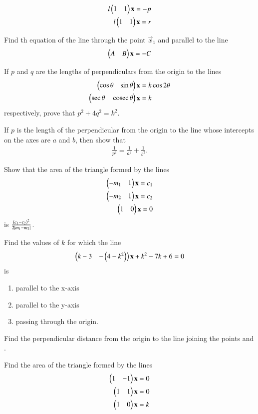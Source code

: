 %
\begin{align}
l\begin{pmatrix}1 & 1\end{pmatrix}\mathbf{x} = -p
\\
l\begin{pmatrix}1 & 1\end{pmatrix}\mathbf{x} = r
\end{align}
%
\item Find th equation of the line through the point $\vec{x}_1$ and parallel to the line
%
\begin{align}
\begin{pmatrix}A & B\end{pmatrix}\mathbf{x} = -C
\end{align}
%
\item If $p$ and $q$ are the lengths of perpendiculars from the origin to the lines 
%
\begin{align}
\begin{pmatrix}\cos\theta & \sin\theta\end{pmatrix}\mathbf{x} &= k\cos2\theta
\\
\begin{pmatrix}\sec\theta & \,\text{cosec}\,\theta\end{pmatrix}\mathbf{x} &= k
\end{align}
%
respectively, prove that $p^2+4q^2=k^2$.
\item If $p$ is the length of the perpendicular from the origin to the line whose intercepts on the axes are $a$ and $b$, then show that 
%
\begin{align}
\frac{1}{p^2} = \frac{1}{a^2}+\frac{1}{b^2}.
\end{align}
%
\item Show that the area of the triangle formed by the lines
%
\begin{align}
\begin{pmatrix}-m_1 & 1\end{pmatrix}\mathbf{x} = c_1
\\
\begin{pmatrix}-m_2 & 1\end{pmatrix}\mathbf{x} = c_2
\\
\begin{pmatrix}1 & 0\end{pmatrix}\mathbf{x} = 0
\end{align}
%
is $\frac{\left(c_1-c_2\right)^2}{2\left\vert m_1-m_2\right\vert}$.
\item Find the values of $k$ for which the line 
%
\begin{align}
\begin{pmatrix}k-3 & -\left(4-k^2\right)\end{pmatrix}\mathbf{x} +k^2-7k+6= 0
\end{align}
%
is
\begin{enumerate}
\item parallel to the x-axis
\item parallel to the y-axis
\item passing through the origin.
\end{enumerate}
%
\solution

\item Find the perpendicular distance from the origin to the line joining the points \myvec{\cos\theta\sin\theta} and \myvec{\cos\phi \sin \phi}.
\item Find the area of the triangle formed by the lines
%
\begin{align}
\begin{pmatrix}1 & -1\end{pmatrix}\mathbf{x} &= 0
\\
\begin{pmatrix}1 & 1\end{pmatrix}\mathbf{x} &= 0
\\
\begin{pmatrix}1 & 0\end{pmatrix}\mathbf{x} &= k
\end{align}
